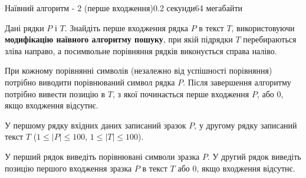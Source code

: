 \begin{problem}{Наївний алгоритм - 2 (перше входження)}{}{}{0.2 секунди}{64 мегабайти}

Дані рядки $P$ і $T$. Знайдіть перше входження рядка $P$ в текст $T$, використовуючи {\bf модифікацію наївного алгоритму пошуку}, 
при якій підрядки $T$ перебираються зліва направо, а посимвольне порівняння рядків виконується справа наліво.

При кожному порівнянні символів (незалежно від успішності порівняння) потрібно виводити порівнюваний символ рядка $P$. 
Після завершення алгоритму потрібно вивести позицію в $T$, з якої починається перше входження $P$, або $0$, якщо входження відсутнє. 

\InputFile
У першому рядку вхідних даних записаний зразок $P$, 
у другому рядку записаний текст $T$ ($1 \le |P| \le 100$, $1 \le |T| \le 100$).


\OutputFile
У перший рядок виведіть порівнювані символи зразка $P$.
У другий рядок виведіть позицію першого входження зразка $P$ в текст $T$ або $0$, якщо входження відсутнє.


\Examples

\begin{example}
%
\end{example}

\end{problem}

